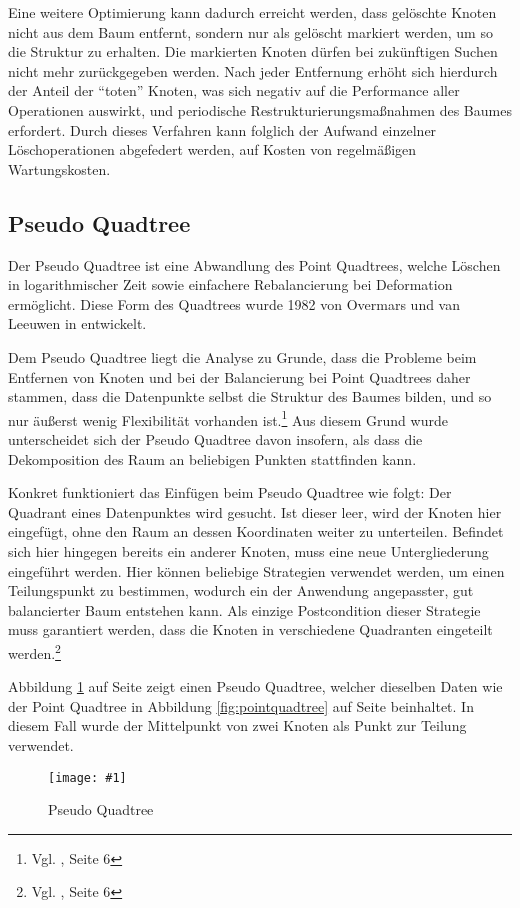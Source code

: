 \documentclass[%
			paper=a4,%
			DIV12,
			liststotoc,
			bibtotoc,
			draft=false,%
			titlepage
			]{scrartcl}
\newcommand{\zit}[3]{#1 \cite{#2}, #3}
\newcommand{\footzit}[3]{\footnote{\zit{#1}{#2}{#3}}}
\newcommand{\myfig}[5] {
 \begin{figure}[tbph]
	 \centering
	 \texttt{[image: \#1]}
	 \caption[#4]{#5}
	 \label{fig:#2}
 \end{figure}
}
\begin{document}
Eine weitere Optimierung kann dadurch erreicht werden, dass gelöschte Knoten nicht aus dem Baum entfernt, sondern nur als gelöscht markiert werden, um so die Struktur zu erhalten.
Die markierten Knoten dürfen bei zukünftigen Suchen nicht mehr zurückgegeben werden.
Nach jeder Entfernung erhöht sich hierdurch der Anteil der "`toten"' Knoten, was sich negativ auf die Performance aller Operationen auswirkt, und periodische Restrukturierungsmaßnahmen des Baumes erfordert.
Durch dieses Verfahren kann folglich der Aufwand einzelner Löschoperationen abgefedert werden, auf Kosten von regelmäßigen Wartungskosten.

\subsection{Pseudo Quadtree}
\label{sec:pseudoquadtree}
Der Pseudo Quadtree ist eine Abwandlung des Point Quadtrees, welche Löschen in logarithmischer Zeit sowie einfachere Rebalancierung bei Deformation ermöglicht. Diese Form des Quadtrees wurde 1982 von Overmars und van Leeuwen in \cite{DBLP:journals/acta/OvermarsL82} entwickelt.

Dem Pseudo Quadtree liegt die Analyse zu Grunde, dass die Probleme beim Entfernen von Knoten und bei der Balancierung bei Point Quadtrees daher stammen, dass die Datenpunkte selbst die Struktur des Baumes bilden, und so nur äußerst wenig Flexibilität vorhanden ist.\footzit{Vgl.}{DBLP:journals/acta/OvermarsL82}{Seite 6}
Aus diesem Grund wurde unterscheidet sich der Pseudo Quadtree davon insofern, als dass die Dekomposition des Raum an beliebigen Punkten stattfinden kann. 

Konkret funktioniert das Einfügen beim Pseudo Quadtree wie folgt:
Der Quadrant eines Datenpunktes wird gesucht.
Ist dieser leer, wird der Knoten hier eingefügt, ohne den Raum an dessen Koordinaten weiter zu unterteilen.
Befindet sich hier hingegen bereits ein anderer Knoten, muss eine neue Untergliederung eingeführt werden.
Hier können beliebige Strategien verwendet werden, um einen Teilungspunkt zu bestimmen, wodurch ein der Anwendung angepasster, gut balancierter Baum entstehen kann.
Als einzige Postcondition dieser Strategie muss garantiert werden,
dass die Knoten in verschiedene Quadranten eingeteilt werden.\footzit{Vgl.}{DBLP:journals/acta/OvermarsL82}{Seite 6}

Abbildung \ref{fig:pseudoquadtree} auf Seite \pageref{fig:pseudoquadtree} zeigt einen Pseudo Quadtree, welcher dieselben Daten wie der Point Quadtree in Abbildung \ref{fig:pointquadtree} auf Seite \pageref{fig:pointquadtree} beinhaltet.
In diesem Fall wurde der Mittelpunkt von zwei Knoten als Punkt zur Teilung verwendet.
\myfig{img/pseudoquadtree-ins3-trimmed}{pseudoquadtree}{width=.6\textwidth}{Pseudo Quadtree}{Pseudo Quadtree}
\end{document}
